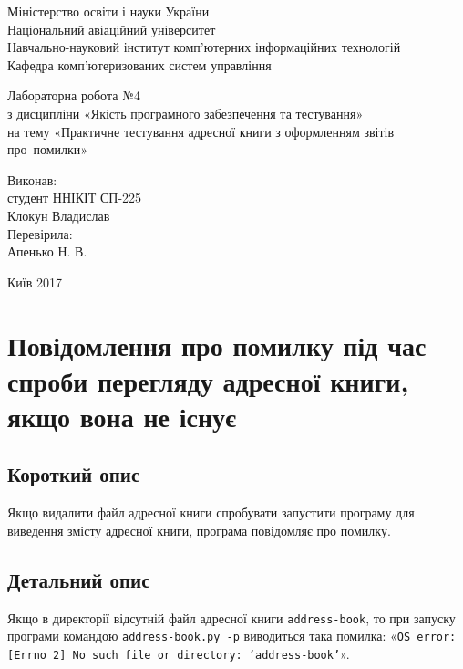 \documentclass[a4paper,oneside,DIV=12,12pt]{scrartcl}
\newcommand\filename[1]{\texttt{#1}}
\newcommand\error[1]{\texttt{#1}}
\begin{document}
    \begin{titlepage}
    \begin{center}
	Міністерство освіти і науки України\\
	Національний авіаційний університет\\
	Навчально-науковий інститут комп'ютерних інформаційних технологій\\
	Кафедра комп'ютеризованих систем управління

	\vspace{\fill}

	Лабораторна робота №4\\
	з дисципліни «Якість програмного забезпечення та тестування»\\
	на тему «Практичне тестування адресної книги з оформленням звітів про~помилки»

	\vspace{\fill}
	
	\begin{flushright}
				Виконав:\\
				студент ННІКІТ СП-225\\
				Клокун Владислав\\
				Перевірила:\\
				Апенько Н. В.
	\end{flushright}

	Київ 2017

    \end{center}
    \end{titlepage}
	
	
	\section{Повідомлення про помилку під час спроби перегляду адресної книги, якщо вона не існує}
		
		\subsection{Короткий опис}
				Якщо видалити файл адресної книги спробувати запустити програму для виведення змісту адресної книги, програма повідомляє про помилку.
				
		\subsection{Детальний опис}
				Якщо в директорії відсутній файл адресної книги \filename{address-book}, то при запуску програми командою \verb+address-book.py -p+ виводиться така помилка: «\error{OS error: [Errno 2] No such file or directory: 'address-book'}».
				
\end{document}
